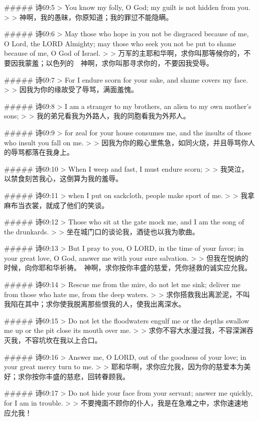##### 诗69:5
> You know my folly, O God; my guilt is not hidden from you.
>
> 神啊，我的愚昧，你原知道；我的罪愆不能隐瞒。


##### 诗69:6
> May those who hope in you not be disgraced because of me, O Lord, the LORD Almighty; may those who seek you not be put to shame because of me, O God of Israel.
>
> 万军的主耶和华啊，求你叫那等候你的，不要因我蒙羞；以色列的　神啊，求你叫那寻求你的，不要因我受辱。


##### 诗69:7
> For I endure scorn for your sake, and shame covers my face.
>
> 因我为你的缘故受了辱骂，满面羞愧。


##### 诗69:8
> I am a stranger to my brothers, an alien to my own mother's sons;
>
> 我的弟兄看我为外路人，我的同胞看我为外邦人。


##### 诗69:9
> for zeal for your house consumes me, and the insults of those who insult you fall on me.
>
> 因我为你的殿心里焦急，如同火烧，并且辱骂你人的辱骂都落在我身上。


##### 诗69:10
> When I weep and fast, I must endure scorn;
>
> 我哭泣，以禁食刻苦我心，这倒算为我的羞辱。


##### 诗69:11
> when I put on sackcloth, people make sport of me.
>
> 我拿麻布当衣裳，就成了他们的笑谈。


##### 诗69:12
> Those who sit at the gate mock me, and I am the song of the drunkards.
>
> 坐在城门口的谈论我，酒徒也以我为歌曲。


##### 诗69:13
> But I pray to you, O LORD, in the time of your favor; in your great love, O God, answer me with your sure salvation.
>
> 但我在悦纳的时候，向你耶和华祈祷。　神啊，求你按你丰盛的慈爱，凭你拯救的诚实应允我。


##### 诗69:14
> Rescue me from the mire, do not let me sink; deliver me from those who hate me, from the deep waters.
>
> 求你搭救我出离淤泥，不叫我陷在其中；求你使我脱离那些恨我的人，使我出离深水。


##### 诗69:15
> Do not let the floodwaters engulf me or the depths swallow me up or the pit close its mouth over me.
>
> 求你不容大水漫过我，不容深渊吞灭我，不容坑坎在我以上合口。


##### 诗69:16
> Answer me, O LORD, out of the goodness of your love; in your great mercy turn to me.
>
> 耶和华啊，求你应允我，因为你的慈爱本为美好；求你按你丰盛的慈悲，回转眷顾我。


##### 诗69:17
> Do not hide your face from your servant; answer me quickly, for I am in trouble.
>
> 不要掩面不顾你的仆人，我是在急难之中，求你速速地应允我！



